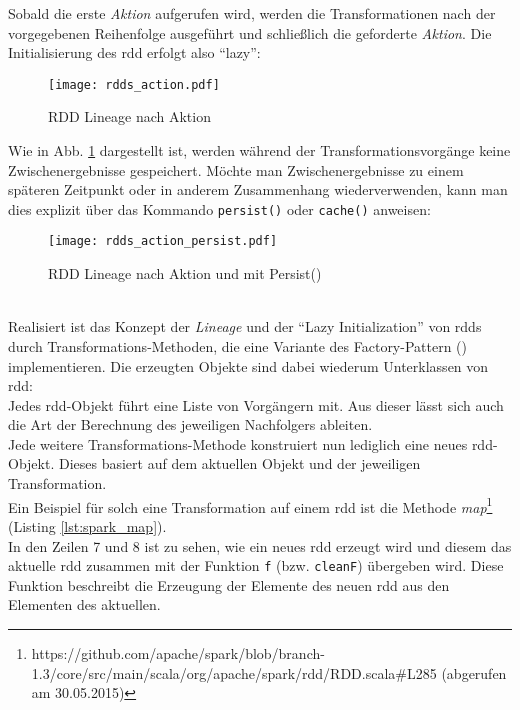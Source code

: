 Sobald die erste \textit{Aktion} aufgerufen wird, werden die Transformationen nach der vorgegebenen Reihenfolge ausgeführt und schließlich die geforderte \textit{Aktion}. Die Initialisierung des \gls{rdd} erfolgt also "`lazy"':\\

\begin{figure}[ht!]
	\centering
  \texttt{[image: rdds\_action.pdf]}
	\caption{RDD Lineage nach Aktion}
	\label{fig:rdds_action}
\end{figure}

Wie in Abb. \ref{fig:rdds_action} dargestellt ist, werden während der Transformationsvorgänge keine Zwischenergebnisse gespeichert. Möchte man Zwischenergebnisse zu einem späteren Zeitpunkt oder in anderem Zusammenhang wiederverwenden, kann man dies explizit über das Kommando \lstinline|persist()| oder \lstinline|cache()| anweisen:\\

\begin{figure}[ht!]
	\centering
  \texttt{[image: rdds\_action\_persist.pdf]}
	\caption{RDD Lineage nach Aktion und mit Persist()}
	\label{fig:rdds_action_persist}
\end{figure}
\\
Realisiert ist das Konzept der \textit{Lineage} und der "`Lazy Initialization"' von \glspl{rdd} durch Transformations-Methoden, die eine Variante des Factory-Pattern (\cite{FPP13}) implementieren. Die erzeugten Objekte sind dabei wiederum Unterklassen von \gls{rdd}:\\
Jedes \gls{rdd}-Objekt führt eine Liste von Vorgängern mit. Aus dieser lässt sich auch die Art der Berechnung des jeweiligen Nachfolgers ableiten.\\

Jede weitere Transformations-Methode konstruiert nun lediglich eine neues \gls{rdd}-Objekt. Dieses basiert auf dem aktuellen Objekt und der jeweiligen Transformation.\\

Ein Beispiel für solch eine Transformation auf einem \gls{rdd} ist die Methode \textit{map}\footnote{https://github.com/apache/spark/blob/branch-1.3/core/src/main/scala/org/apache/spark/rdd/RDD.scala#L285 (abgerufen am 30.05.2015)} (Listing \ref{lst:spark_map}).\\

In den Zeilen 7 und 8 ist zu sehen, wie ein neues \gls{rdd} erzeugt wird und diesem das aktuelle \gls{rdd} zusammen mit der Funktion \lstinline|f| (bzw. \lstinline|cleanF|) übergeben wird. Diese Funktion beschreibt die Erzeugung der Elemente des neuen \gls{rdd} aus den Elementen des aktuellen.\\

